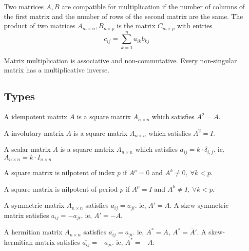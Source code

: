 \begin{definition}[mulitplication]
	Two matrices $A,B$ are compatible for multiplication if the number of columns of the first matrix and the number of rows of the second matrix are the same.
	The product of two matrices $A_{m \times n},B_{n \times p}$ is the matrix $C_{m \times p}$ with entries
	$$ c_{ij} = \sum_{k=1}^n a_{ik}b_{kj} $$
\end{definition}
\begin{note}
	Matrix multiplication is associative and non-commutative.
	Every non-singular matrix has a multiplicative inverse.
\end{note}

\subsection{Types}
\begin{definition}[idempotent]
	A idempotent matrix $A$ is a square matrix $A_{n \times n}$ which satisfies $A^2 = A$.
\end{definition}

\begin{definition}[involutary]
	A involutary matrix $A$ is a square matrix $A_{n \times n}$ which satisfies $A^2 = I$.
\end{definition}

\begin{definition}[scalar]
	A scalar matrix $A$ is a square matrix $A_{n \times n}$ which satisfies $a_{ij} = k \cdot \delta_{i,j}$. ie, $A_{n \times n} = k \cdot I_{n \times n}$
\end{definition}

\begin{definition}[nilpotent]
	A square matrix is nilpotent of index $p$ if $A^p = 0$ and $A^k \ne 0,\ \forall k < p$.
\end{definition}

\begin{definition}[periodic]
	A square matrix is nilpotent of period $p$ if $A^p = I$ and $A^k \ne I,\ \forall k < p$.
\end{definition}

\begin{definition}[symmetric]
	A symmetric matrix $A_{n \times n}$ satisfies $a_{ij} = a_{ji}$. ie, $A' = A$.
	A skew-symmetric matrix satisfies $a_{ij} = -a_{ji}$. ie, $A' = -A$.
\end{definition}

\begin{definition}[hermitian]
	A hermitian matrix $A_{n \times n}$ satisfies $\overline{a_{ij}} = {a_{ji}}$. ie, $A^\ast = A,\ A^\ast = \bar{A}'$.
	A skew-hermitian matrix satisfies $\overline{a_{ij}} = -a_{ji}$. ie, $A^\ast = -A$.
\end{definition}

